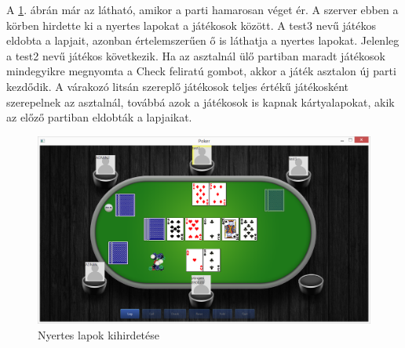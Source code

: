 A \ref{fig:parti_4}. ábrán már az látható, amikor a parti hamarosan véget ér. A szerver ebben a körben hirdette ki a nyertes lapokat a játékosok között. A test3 nevű játékos eldobta a lapjait, azonban értelemszerűen ő is láthatja a nyertes lapokat. Jelenleg a test2 nevű játékos következik. Ha az asztalnál ülő partiban maradt játékosok mindegyikre megnyomta a Check feliratú gombot, akkor a játék asztalon új parti kezdődik. A várakozó litsán szereplő játékosok teljes értékű játékosként szerepelnek az asztalnál, továbbá azok a játékosok is kapnak kártyalapokat, akik az előző partiban eldobták a lapjaikat.
 \begin{figure}[h!]
  \caption{Nyertes lapok kihirdetése}
  \label{fig:parti_4}
  \centering
    \includegraphics[width=\textwidth]{user-documentation/images/parti/parti_4.jpg}
\end{figure}

\clearpage
